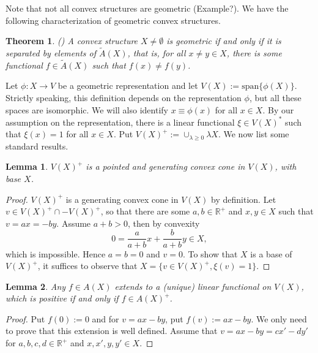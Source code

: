 \documentclass[12pt]{article}
\newtheorem{lemma}{Lemma}
\newtheorem{thm}{Theorem}
\newcommand{\<}{\langle}
\begin{document}
 Note that not all convex structures are geometric (Example?). We have the following characterization of geometric convex structures.
\begin{thm}(\cite[Thm. 2.2]{gudder}) A convex structure $X\neq \emptyset$ is geometric if and only if it is separated by elements of $\widetilde A(X)$, 
that is, for all $x\ne y\in X$, there is some functional $f\in \widetilde A(X)$ such that $f(x)\ne f(y)$. 
\end{thm}


Let $\phi:X\to V$ be a geometric representation and let $V(X):=\mathrm{span}\{\phi(X)\}$. Strictly speaking, this definition depends on the representation $\phi$, but all
 these  spaces  are isomorphic. We will also identify $x\equiv \phi(x)$ for all $x\in X$. By our assumption on the representation, there is a linear functional $\xi\in V(X)^*$ such that 
 $\xi(x)=1$ for all $x\in X$. Put $V(X)^+:=\cup_{\lambda\ge 0} \lambda X$. We now list some standard results.

\begin{lemma} %
$V(X)^+$ is a pointed and generating convex cone in $V(X)$, with base $X$.

\end{lemma}

\begin{proof} $V(X)^+$ is a generating convex cone in $V(X)$ by definition. Let $v\in V(X)^+\cap -V(X)^+$, so that there are some $a,b\in \mathbb R^+$ and $x,y\in X$ such that $v=ax=-by$. Assume $a+b>0$, then by convexity 
\[
0=\frac a{a+b}x+\frac b{a+b}y\in X,
\]
 which is impossible. Hence $a=b=0$ and $v=0$. To show that $X$ is a base of $V(X)^+$, it suffices to observe that $X=\{v\in V(X)^+, \xi(v)=1\}$.


\end{proof}



\begin{lemma} Any $f\in A(X)$ extends to a (unique) linear functional on $V(X)$, which is positive if and only if $f\in A(X)^+$.

\end{lemma}

\begin{proof} Put $f(0):=0$ and for $v=ax-by$, put $f(v):=ax-by$. We only need to prove that this extension is well defined. Assume that $v=ax-by=cx'-dy'$ for $a,b,c,d\in \mathbb R^+$ and $x,x',y,y'\in X$.


\end{proof}
\end{document}
